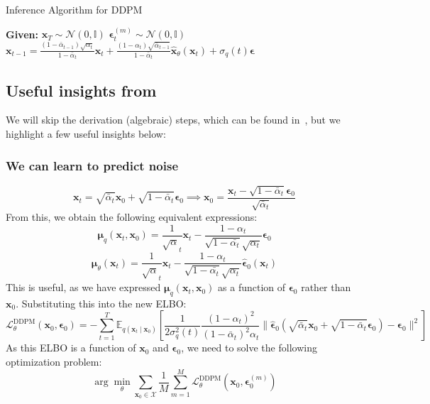 \documentclass{article}
\newcommand{\x}{\mathbf{x}}
\newcommand{\N}{\mathcal{N}}
\newcommand{\E}{\mathbb{E}}
\begin{document}
	\begin{algorithm}
		\caption{Inference Algorithm for DDPM}
		\begin{algorithmic}[1]
			\State \textbf{Given:} $\x_T \sim \N (0, \mathbb{I})$
				\State $\boldsymbol{\epsilon}_t^{(m)} \sim \N (0, \mathbb{I})$
				\State $\displaystyle \x_{t-1} = \frac{(1 - \bar{\alpha}_{t-1}) \sqrt{\alpha_t}}{1 - \bar{\alpha}_t} \x_t + \frac{(1 - \alpha_t) \sqrt{\bar{\alpha}_{t-1}}}{1 - \bar{\alpha}_t} \hat{\x}_\theta (\x_t) + \sigma_q (t) \boldsymbol{\epsilon}$
			\EndFor
		\end{algorithmic}
	\end{algorithm}
	
	\subsection*{Useful insights from \cite{ho2020}}
	
	We will skip the derivation (algebraic) steps, which can be found in~\cite{ho2020}, but we highlight a few useful insights below:
	
	\subsubsection*{We can learn to predict noise}
	$$\x_t = \sqrt{\bar{\alpha}_t} \x_0 + \sqrt{1 - \bar{\alpha}_t} \boldsymbol{\epsilon}_0 \implies \x_0 = \frac{\x_t - \sqrt{1 - \bar{\alpha}_t} \boldsymbol{\epsilon}_0 }{\sqrt{\bar{\alpha}_t}}$$
	From this, we obtain the following equivalent expressions:
	$$\boldsymbol{\mu}_q (\x_t, \x_0) = \frac{1}{\sqrt{\alpha}_t} \x_t - \frac{1 - \alpha_t}{\sqrt{1 - \bar{\alpha_t}} \sqrt{\alpha_t}} \boldsymbol{\epsilon}_0$$
	$$\boldsymbol{\mu}_\theta (\x_t) = \frac{1}{\sqrt{\alpha}_t} \x_t - \frac{1 - \alpha_t}{\sqrt{1 - \bar{\alpha_t}} \sqrt{\alpha_t}} \boldsymbol{\hat{\epsilon}}_0 (\x_t)$$
	This is useful, as we have expressed $\boldsymbol{\mu}_q(\x_t, \x_0)$ as a function of $\boldsymbol{\epsilon}_0$ rather than $\x_0$. Substituting this into the new ELBO:
	$$\mathcal{L}_\theta^{\mathrm{DDPM}} (\x_0, \boldsymbol{\epsilon}_0) = - \sum_{t=1}^{T} \E_{q (\x_t \mid \x_0)} \left[ \frac{1}{2 \sigma_q^2(t)} \frac{(1 - \alpha_t)^2 }{(1 - \bar{\alpha}_t)^2 \alpha_t} \lVert \boldsymbol{\hat{\epsilon}}_0 \left( \sqrt{\bar{\alpha}_t} \x_0 + \sqrt{1 - \bar{\alpha}_t} \boldsymbol{\epsilon}_0 \right) - \boldsymbol{\epsilon}_0 \rVert^2 \right] $$
	As this ELBO is a function of $\x_0$ and $\boldsymbol{\epsilon}_0$, we need to solve the following optimization problem: $$\arg\min_\theta \sum_{\x_0 \in \mathcal{X}} \frac{1}{M} \sum_{m=1}^{M} \mathcal{L}_\theta^{\mathrm{DDPM}} (\x_0, \boldsymbol{\epsilon}_0^{(m)})$$
	
\end{document}
